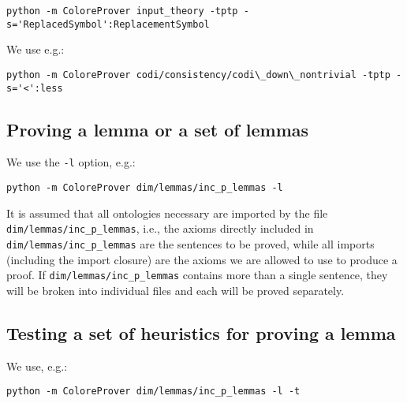 \documentclass{article}
\begin{document}
\begin{verbatim}
python -m ColoreProver input_theory -tptp -s='ReplacedSymbol':ReplacementSymbol
\end{verbatim}

We use e.g.: 

\begin{verbatim}
python -m ColoreProver codi/consistency/codi\_down\_nontrivial -tptp -s='<':less
\end{verbatim}



\subsection{Proving a lemma or a set of lemmas}

We use the \texttt{-l} option, e.g.:

\begin{verbatim}
python -m ColoreProver dim/lemmas/inc_p_lemmas -l
\end{verbatim}
It is assumed that all ontologies necessary are imported by the file \texttt{dim/lemmas/inc\_p\_lemmas}, i.e., the axioms directly included in \texttt{dim/lemmas/inc\_p\_lemmas} are the sentences to be proved, while all imports (including the import closure) are the axioms we are allowed to use to produce a proof.
If \texttt{dim/lemmas/inc\_p\_lemmas} contains more than a single sentence, they will be broken into individual files and each will be proved separately. 

\subsection{Testing a set of heuristics for proving a lemma}

We use, e.g.:

\begin{verbatim}
python -m ColoreProver dim/lemmas/inc_p_lemmas -l -t
\end{verbatim}
\end{document}
